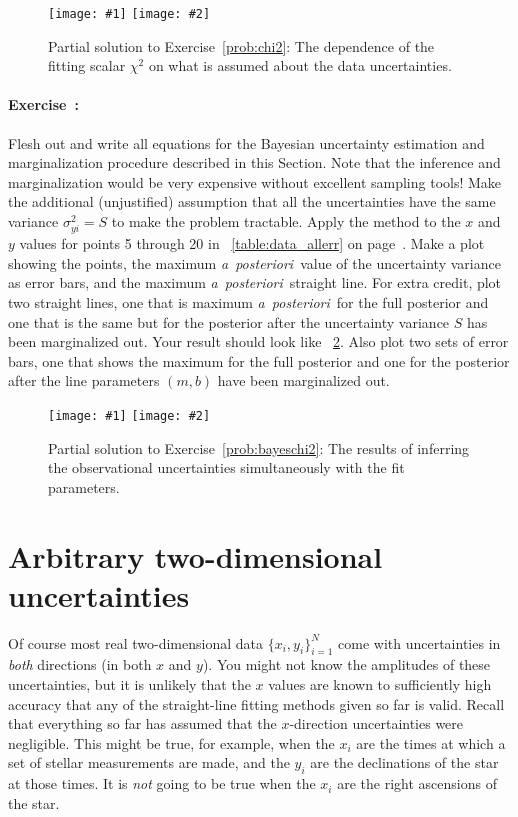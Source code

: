 \documentclass[12pt,twoside,pdftex]{article}
\newcommand{\exampleplottwo}[2]{%
\begin{center}%
\texttt{[image: \#1]}%
\texttt{[image: \#2]}%
\end{center}%
}
\newcommand{\notenglish}[1]{\textsl{#1}}
\newcommand{\aposteriori}{\notenglish{a~posteriori}}
\newcommand{\sectionname}{Section}
\newcommand{\problemname}{Exercise}
\newcounter{problem}
\newenvironment{problem}{\paragraph{\problemname~\theproblem:}\refstepcounter{problem}}{}
\newcommand{\setofall}[3]{\{{#1}\}_{{#2}}^{{#3}}}
\newcommand{\allxy}{\setofall{x_i,y_i}{i=1}{N}}
\begin{document}
\begin{figure}[htbp]
\exampleplottwo{ex9a}{ex9b}
\caption{Partial solution to \problemname~\ref{prob:chi2}: The
dependence of the fitting scalar $\chi^2$ on what is assumed about the
data uncertainties.}\label{fig:chi2}
\end{figure}

\begin{problem}\label{prob:bayeschi2}
Flesh out and write all equations for the Bayesian uncertainty
estimation and marginalization procedure described in this
\sectionname.  Note that the inference and marginalization would be
very expensive without excellent sampling tools!  Make the additional
(unjustified) assumption that all the uncertainties have the same
variance $\sigma_{yi}^2=S$ to make the problem tractable.  Apply the
method to the $x$ and $y$ values for points 5 through 20 in
\tablename~\ref{table:data_allerr} on
page~\pageref{table:data_allerr}.  Make a plot showing the points, the
maximum \aposteriori\ value of the uncertainty variance as error bars,
and the maximum \aposteriori\ straight line.  For extra credit, plot
two straight lines, one that is maximum \aposteriori\ for the full
posterior and one that is the same but for the posterior after the
uncertainty variance $S$ has been marginalized out.  Your result
should look like \figurename~\ref{fig:bayeschi2}.  Also plot two
sets of error bars, one that shows the maximum for the full posterior
and one for the posterior after the line parameters $(m,b)$ have been
marginalized out.
\end{problem}

\begin{figure}[htbp]
\exampleplottwo{ex10a}{ex10b}
\caption{Partial solution to \problemname~\ref{prob:bayeschi2}: The
results of inferring the observational uncertainties simultaneously
with the fit parameters.}\label{fig:bayeschi2}
\end{figure}

\section{Arbitrary two-dimensional uncertainties}\label{sec:twod}

Of course most real two-dimensional data $\allxy$ come with
uncertainties in \emph{both} directions (in both $x$ and $y$).  You
might not know the amplitudes of these uncertainties, but it is
unlikely that the $x$ values are known to sufficiently high accuracy
that any of the straight-line fitting methods given so far is valid.
Recall that everything so far has assumed that the $x$-direction
uncertainties were negligible.  This might be true, for example, when
the $x_i$ are the times at which a set of stellar measurements are
made, and the $y_i$ are the declinations of the star at those times.
It is \emph{not} going to be true when the $x_i$ are the right
ascensions of the star.
\end{document}
